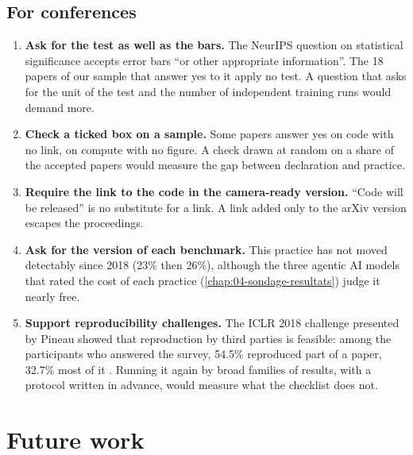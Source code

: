 \subsection{For conferences}

\begin{enumerate}
  \item \textbf{Ask for the test as well as the bars.} The NeurIPS question on statistical
        significance accepts error bars \enquote{or other appropriate information}. The 18 papers of
        our sample that answer yes to it apply no test. A question that asks for the unit of the test and the number
        of independent training runs would demand more.
  \item \textbf{Check a ticked box on a sample.} Some papers answer yes on code with no link, on
        compute with no figure. A check drawn at random on a share of the accepted papers would
        measure the gap between declaration and practice.
  \item \textbf{Require the link to the code in the camera-ready version.} \enquote{Code will be
        released} is no substitute for a link. A link added only to the arXiv version escapes the
        proceedings.
  \item \textbf{Ask for the version of each benchmark.} This practice has not moved detectably since
        2018 (23\% then 26\%), although the three agentic AI models that rated the cost of each
        practice (\cref{chap:04-sondage-resultats}) judge it nearly free.
  \item \textbf{Support reproducibility challenges.} The ICLR 2018 challenge presented by Pineau
        showed that reproduction by third parties is feasible: among the participants who answered
        the survey, 54.5\% reproduced part of a paper, 32.7\% most of it
        \parencite[slides 37 to 43]{pineau2018iclr}. Running it again by broad families of results,
        with a protocol written in advance, would measure what the checklist does not.
\end{enumerate}

\section{Future work}
\label{sec:futurs}

